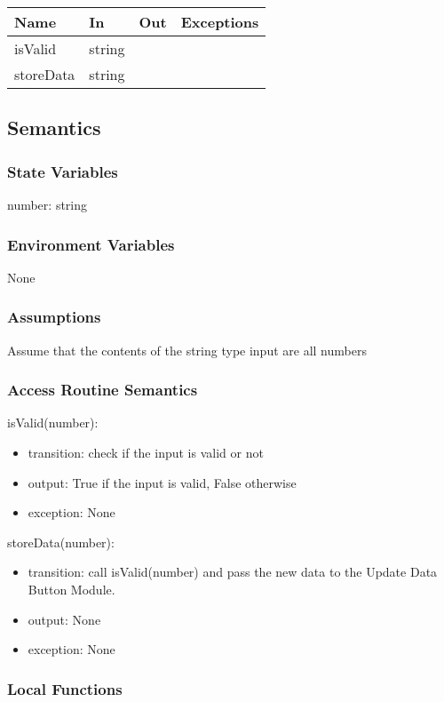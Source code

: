 \documentclass[12pt, titlepage]{article}
\begin{document}
\begin{center}
\begin{tabular}{|l|l|l|p{5cm}|}
\hline
\textbf{Name} & \textbf{In} & \textbf{Out} & \textbf{Exceptions} \\
\hline
isValid & string & & \\
\hline
storeData & string & &\\
\hline
\end{tabular}
\end{center}

\subsection{Semantics}

\subsubsection{State Variables}
number: string

\subsubsection{Environment Variables}
None
\subsubsection{Assumptions}

Assume that the contents of the string type input are all numbers 
\subsubsection{Access Routine Semantics}

\noindent isValid(number):
\begin{itemize}
\item transition: check if the input is valid or not
\item output: True if the input is valid, False otherwise
\item exception: None 
\end{itemize}
\noindent storeData(number):
\begin{itemize}
\item transition: call isValid(number) and pass the new data to the Update Data Button Module.
\item output: None
\item exception: None 
\end{itemize}

\subsubsection{Local Functions}
\end{document}
